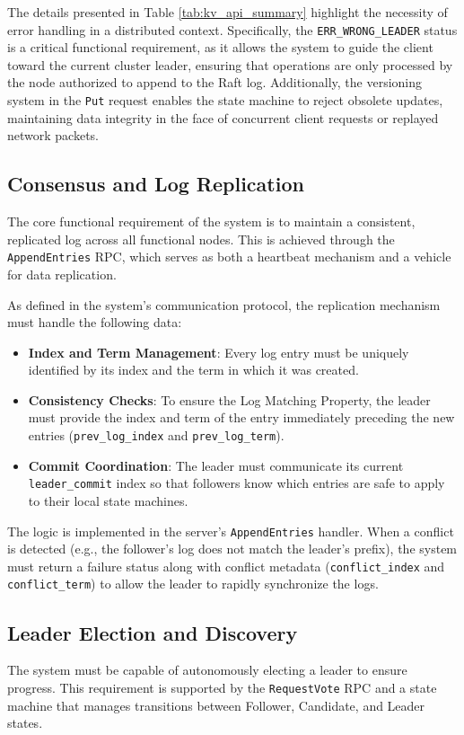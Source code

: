 The details presented in Table \ref{tab:kv_api_summary} highlight the necessity of error handling in a distributed context. Specifically, the \texttt{ERR\_WRONG\_LEADER} status is a critical functional requirement, as it allows the system to guide the client toward the current cluster leader, ensuring that operations are only processed by the node authorized to append to the Raft log. Additionally, the versioning system in the \texttt{Put} request enables the state machine to reject obsolete updates, maintaining data integrity in the face of concurrent client requests or replayed network packets.

\subsection{Consensus and Log Replication}
The core functional requirement of the system is to maintain a consistent, replicated log across all functional nodes. This is achieved through the \texttt{AppendEntries} RPC, which serves as both a heartbeat mechanism and a vehicle for data replication.

As defined in the system's communication protocol, the replication mechanism must handle the following data:
\begin{itemize}
    \item \textbf{Index and Term Management}: Every log entry must be uniquely identified by its index and the term in which it was created.
    \item \textbf{Consistency Checks}: To ensure the Log Matching Property, the leader must provide the index and term of the entry immediately preceding the new entries (\texttt{prev\_log\_index} and \texttt{prev\_log\_term}).
    \item \textbf{Commit Coordination}: The leader must communicate its current \texttt{leader\_commit} index so that followers know which entries are safe to apply to their local state machines.
\end{itemize}

The logic is implemented in the server's \texttt{AppendEntries} handler. When a conflict is detected (e.g., the follower's log does not match the leader's prefix), the system must return a failure status along with conflict metadata (\texttt{conflict\_index} and \texttt{conflict\_term}) to allow the leader to rapidly synchronize the logs.

\subsection{Leader Election and Discovery}
The system must be capable of autonomously electing a leader to ensure progress. This requirement is supported by the \texttt{RequestVote} RPC and a state machine that manages transitions between Follower, Candidate, and Leader states.


